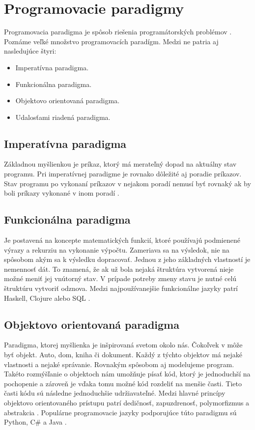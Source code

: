 \section{Programovacie paradigmy}
\noindent Programovacia paradigma je spôsob riešenia programátorských problémov \cite{Samuel2018AnII}. Poznáme veľké množstvo programovacích paradígm. Medzi ne patria aj nasledujúce štyri:
\begin{itemize}
  \item Imperatívna paradigma.
  \item Funkcionálna paradigma.
  \item Objektovo orientovaná paradigma.
  \item Udalosťami riadená paradigma.
\end{itemize}

\subsection{Imperatívna paradigma}
\noindent Základnou myšlienkou je príkaz, ktorý má merateľný dopad na aktuálny stav programu. Pri imperatívnej paradigme je rovnako dôležité aj poradie príkazov. Stav programu po vykonaní príkazov v nejakom poradí nemusí byť rovnaký ak by boli príkazy vykonané v inom poradí \cite{imperativParadigm}. 

\subsection{Funkcionálna paradigma}
\noindent Je postavená na koncepte matematických funkcií, ktoré používajú podmienené výrazy a rekurziu na vykonanie výpočtu. Zameriava sa na výsledok, nie na spôsobom akým sa k výsledku dopracovať. Jednou z jeho základných vlastností je nemennosť dát. To znamená, že ak už bola nejaká štruktúra vytvorená nieje možné meniť jej vnútorný stav. V prípade potreby zmeny stavu je nutné celú štruktúru vytvoriť odznova. Medzi najpoužívanejšie funkcionálne jazyky patrí Haskell, Clojure alebo SQL \cite{functionalParadigm}.

\subsection{Objektovo orientovaná paradigma}
\noindent Paradigma, ktorej myšlienka je inšpirovaná svetom okolo nás. Čokoľvek v môže byť objekt. Auto, dom, kniha či dokument. Každý z týchto objektov má nejaké vlastnosti a nejaké správanie. Rovnakým spôsobom aj modelujeme program. Takéto rozmýšľanie o objektoch nám umožňuje písať kód, ktorý je jednoduchší na pochopenie a zároveň je vďaka tomu možné kód rozdeliť na menšie časti. Tieto časti kódu sú následne jednoduchšie udržiavateľné. Medzi hlavné princípy objektovo orientovaného prístupu patrí dedičnosť, zapuzdrenosť, polymorfizmus a abstrakcia \cite{objectOrientedParadigm}. Populárne programovacie jazyky podporujúce túto paradigmu sú Python, C\# a Java \cite{stack-overflow-survey-2020}.


